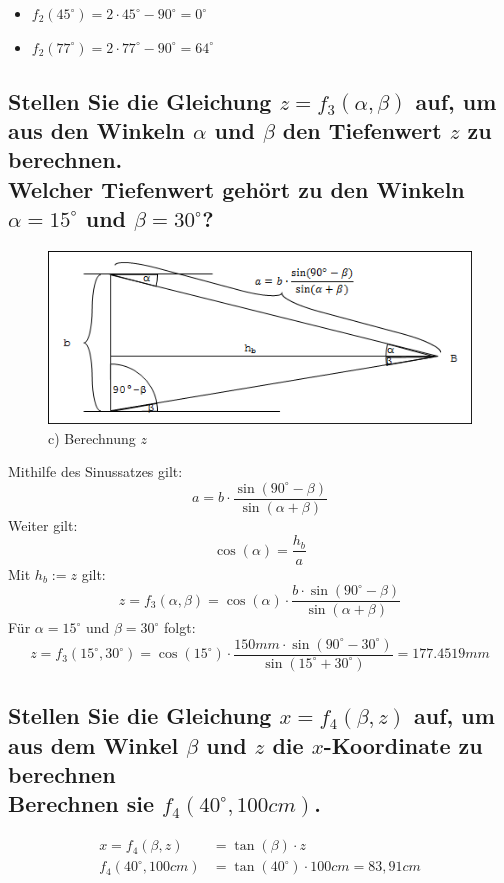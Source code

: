 \documentclass[a4paper,10pt,DIV=14]{scrartcl}
\newcommand{\dg}[1]{#1^\circ}
\begin{document}
\begin{itemize}[itemsep=0pt]
	\item $f_2(\dg{45}) = 2 \cdot \dg{45} - \dg{90} =  \dg{0}$
	\item $f_2(\dg{77}) = 2 \cdot \dg{77} - \dg{90} =  \dg{64}$
\end{itemize}


\subsection{Stellen Sie die Gleichung $z = f_3(\alpha, \beta)$ auf, um aus den Winkeln $\alpha$ und $\beta$ den Tiefenwert $z$ zu berechnen. \\ Welcher Tiefenwert gehört zu den Winkeln $\alpha = 15^\circ$ und $\beta = 30^\circ$?}

\begin{figure}[H]
	\centering
	\includegraphics[width=.95\linewidth]{z.png}
	\caption*{c) Berechnung $z$}
\end{figure}

Mithilfe des Sinussatzes gilt: $$ a = b \cdot \frac{\sin(\dg{90} - \beta)}{\sin(\alpha + \beta)} $$
Weiter gilt: $$ \cos(\alpha) = \frac{h_b}{a} $$
Mit $h_b := z$ gilt:
$$ z = f_3(\alpha, \beta) = \cos(\alpha) \cdot \frac{b \cdot \sin(\dg{90} - \beta)}{\sin(\alpha + \beta)} $$
Für $\alpha = \dg{15}$ und $\beta = \dg{30}$ folgt:
$$ z =  f_3(\dg{15}, \dg{30}) = \cos(\dg{15}) \cdot \frac{150mm \cdot \sin(\dg{90} - \dg{30})}{\sin(\dg{15} + \dg{30})} = 177.4519mm $$

\subsection{Stellen Sie die Gleichung $x = f_4(\beta, z)$ auf, um aus dem Winkel $\beta$ und $z$ die $x$-Koordinate zu berechnen \\ Berechnen sie $f_4(40^\circ, 100cm)$.}

\begin{align*}
x = f_4(\beta, z) &= \tan(\beta) \cdot z \\
f_4(\dg{40}, 100cm) &= \tan(\dg{40}) \cdot 100cm = 83,91cm
\end{align*}
\end{document}
